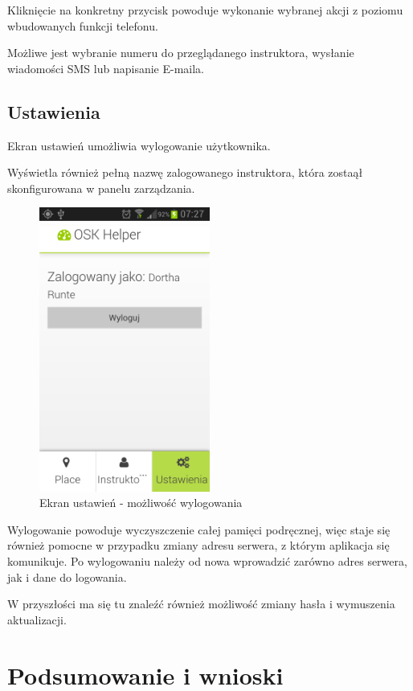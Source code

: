 \documentclass[twoside,a4paper,openright,12pt]{book}
\begin{document}
Kliknięcie na konkretny przycisk powoduje wykonanie wybranej akcji z poziomu wbudowanych funkcji telefonu.

Możliwe jest wybranie numeru do przeglądanego instruktora, wysłanie wiadomości SMS lub napisanie E-maila.

\newpage
\section{Ustawienia}

Ekran ustawień umożliwia wylogowanie użytkownika.

Wyświetla również pełną nazwę zalogowanego instruktora, która zostaął skonfigurowana w panelu zarządzania.

\begin{figure}[H]
\centering
\includegraphics[width=0.5\textwidth]{screenshots/android/ustawienia.png}
\caption{Ekran ustawień - możliwość wylogowania}
\label{fig:Ustawienia_mobile}
\end{figure}

Wylogowanie powoduje wyczyszczenie całej pamięci podręcznej, więc staje się również pomocne w przypadku zmiany adresu serwera, z którym aplikacja się komunikuje. Po wylogowaniu należy od nowa wprowadzić zarówno adres serwera, jak i dane do logowania.

W przyszłości ma się tu znaleźć również możliwość zmiany hasła i wymuszenia aktualizacji.


\chapter{Podsumowanie i wnioski}
\end{document}
